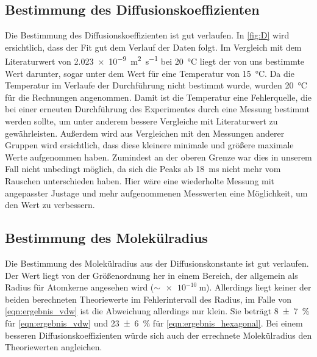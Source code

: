 \subsection{Bestimmung des Diffusionskoeffizienten}
Die Bestimmung des Diffusionskoeffizienten ist gut verlaufen. In \autoref{fig:D}
wird ersichtlich, dass der Fit gut dem Verlauf der Daten folgt. Im Vergleich mit
dem Literaturwert von \SI{2.023e-9}{\meter\squared\per\second} bei
\SI{20}{\celsius} \cite{Diffusionskonstante} liegt der von uns bestimmte Wert
darunter, sogar unter dem Wert für eine Temperatur von \SI{15}{\celsius}. Da die
Temperatur im Verlaufe der Durchführung nicht bestimmt wurde, wurden
\SI{20}{\celsius} für die Rechnungen angenommen. Damit ist die Temperatur eine
Fehlerquelle, die bei einer erneuten Durchführung des Experimentes durch eine
Messung bestimmt werden sollte, um unter anderem bessere Vergleiche mit
Literaturwert zu gewährleisten. Außerdem wird aus Vergleichen mit den Messungen
anderer Gruppen wird ersichtlich, dass diese kleinere minimale und größere
maximale Werte aufgenommen haben. Zumindest an der oberen Grenze war dies in
unserem Fall nicht unbedingt möglich, da sich die Peaks ab \SI{18}{\ms} nicht
mehr vom Rauschen unterschieden haben. Hier wäre eine wiederholte Messung mit
angepasster Justage und mehr aufgenommenen Messwerten eine Möglichkeit, um den
Wert zu verbessern.

\subsection{Bestimmung des Molekülradius} Die Bestimmung des Molekülradius aus
der Diffusionskonstante ist gut verlaufen. Der Wert liegt von der Größenordnung
her in einem Bereich, der allgemein als Radius für Atomkerne angesehen wird
($\sim \SI{e-10}{\m}$). Allerdings liegt keiner der beiden berechneten
Theoriewerte im Fehlerintervall des Radius, im Falle von
\eqref{eqn:ergebnis_vdw} ist die Abweichung allerdings nur klein. Sie beträgt
\SI{8(7)}{\percent} für \eqref{eqn:ergebnis_vdw} und \SI{23(6)}{\percent} für
\eqref{eqn:ergebnis_hexagonal}. Bei einem besseren Diffusionskoeffizienten
würde sich auch der errechnete Molekülradius den Theoriewerten angleichen.
